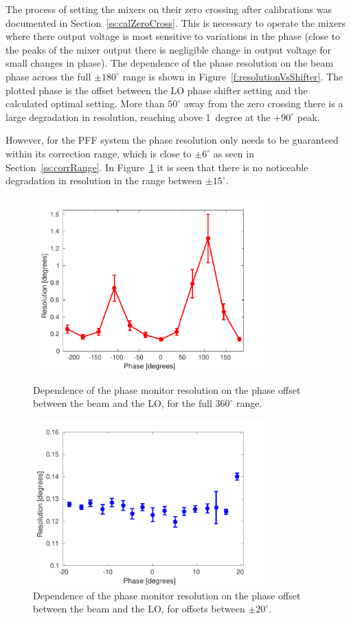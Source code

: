 The process of setting the mixers on their zero crossing after calibrations was documented in Section~\ref{ss:calZeroCross}. This is necessary to operate the mixers where there output voltage is most sensitive to variations in the phase (close to the peaks of the mixer output there is negligible change in output voltage for small changes in phase). The dependence of the phase resolution on the beam phase across the full \(\pm180^\circ\) range is shown in Figure~\ref{f:resolutionVsShifter}. The plotted phase is the offset between the LO phase shifter setting and the calculated optimal setting. More than \(50^\circ\) away from the zero crossing there is a large degradation in resolution, reaching above 1~degree at the \(+90^\circ\) peak.

However, for the PFF system the phase resolution only needs to be guaranteed within its correction range, which is close to \(\pm6^\circ\) as seen in Section~\ref{ss:corrRange}. In Figure~\ref{f:resVsSmallPhasOff} it is seen that there is no noticeable degradation in resolution in the range between \(\pm15^\circ\).

\begin{figure}
  \centering
  \includegraphics[width=0.8\textwidth]{Figures/phaseMons/resolutionVsShifter}
  \caption{Dependence of the phase monitor resolution on the phase offset between the beam and the LO, for the full \(360^\circ\) range.}
  \label{f:resolutionVsShifter}
  \includegraphics[width=0.8\textwidth]{Figures/phaseMons/resVsSmallPhasOff}
  \caption{Dependence of the phase monitor resolution on the phase offset between the beam and the LO, for offsets between \(\pm20^\circ\).}
  \label{f:resVsSmallPhasOff}
\end{figure}

